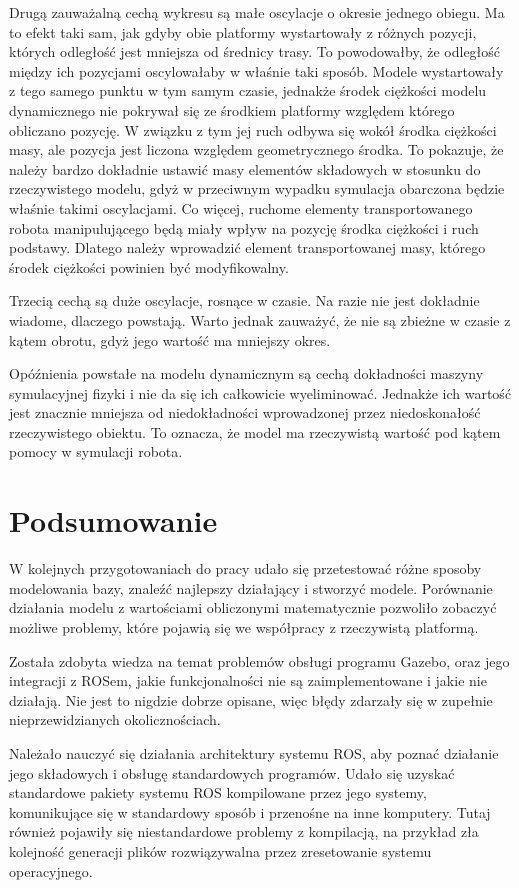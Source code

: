 Drugą zauważalną cechą wykresu są małe oscylacje o okresie jednego obiegu.
Ma to efekt taki sam, jak gdyby obie platformy wystartowały z różnych pozycji, których odległość jest mniejsza od średnicy trasy.
To powodowałby, że odległość między ich pozycjami oscylowałaby w właśnie taki sposób.
Modele wystartowały z tego samego punktu w tym samym czasie, jednakże środek ciężkości modelu dynamicznego nie pokrywał się ze środkiem platformy względem którego obliczano pozycję.
W związku z tym jej ruch odbywa się wokół środka ciężkości masy, ale pozycja jest liczona względem geometrycznego środka.
To pokazuje, że należy bardzo dokładnie ustawić masy elementów składowych w stosunku do rzeczywistego modelu, gdyż w przeciwnym wypadku symulacja obarczona będzie właśnie takimi oscylacjami.
Co więcej, ruchome elementy transportowanego robota manipulującego będą miały wpływ na pozycję środka ciężkości i ruch podstawy.
Dlatego należy wprowadzić element transportowanej masy, którego środek ciężkości powinien być modyfikowalny.

Trzecią cechą są duże oscylacje, rosnące w czasie.
Na razie nie jest dokładnie wiadome, dlaczego powstają.
Warto jednak zauważyć, że nie są zbieżne w czasie z kątem obrotu, gdyż jego wartość ma mniejszy okres.

Opóźnienia powstałe na modelu dynamicznym są cechą dokładności maszyny symulacyjnej fizyki i nie da się ich całkowicie wyeliminować.
Jednakże ich wartość jest znacznie mniejsza od niedokładności wprowadzonej przez niedoskonałość rzeczywistego obiektu.
To oznacza, że model ma rzeczywistą wartość pod kątem pomocy w symulacji robota.

\section{Podsumowanie}
W kolejnych przygotowaniach do pracy udało się przetestować różne sposoby modelowania bazy, znaleźć najlepszy działający i stworzyć modele.
Porównanie działania modelu z wartościami obliczonymi matematycznie pozwoliło zobaczyć możliwe problemy, które pojawią się we współpracy z rzeczywistą platformą.

Została zdobyta wiedza na temat problemów obsługi programu Gazebo, oraz jego integracji z ROSem, jakie funkcjonalności nie są zaimplementowane i jakie nie działają.
Nie jest to nigdzie dobrze opisane, więc błędy zdarzały się w zupełnie nieprzewidzianych okolicznościach.

Należało nauczyć się działania architektury systemu ROS, aby poznać działanie jego składowych i obsługę standardowych programów.
Udało się uzyskać standardowe pakiety systemu ROS kompilowane przez jego systemy, komunikujące się w standardowy sposób i przenośne na inne komputery.
Tutaj również pojawiły się niestandardowe problemy z kompilacją, na przykład zła kolejność generacji plików rozwiązywalna przez zresetowanie systemu operacyjnego.


